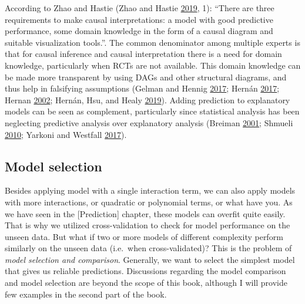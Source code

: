 \documentclass[
]{book}
\begin{document}
According to Zhao and Hastie (Zhao and Hastie \protect\hyperlink{ref-zhaoCausalInterpretationsBlackBox2019}{2019}, 1): ``There are three requirements to make causal interpretations: a model with good predictive performance, some domain knowledge in the form of a causal diagram and suitable visualization tools.''. The common denominator among multiple experts is that for causal inference and causal interpretation there is a need for domain knowledge, particularly when RCTs are not available. This domain knowledge can be made more transparent by using DAGs and other structural diagrams, and thus help in falsifying assumptions (Gelman and Hennig \protect\hyperlink{ref-gelmanSubjectiveObjectiveStatistics2017}{2017}; Hernán \protect\hyperlink{ref-hernanCausalDiagramsDraw2017}{2017}; Hernan \protect\hyperlink{ref-hernanCausalKnowledgePrerequisite2002}{2002}; Hernán, Hsu, and Healy \protect\hyperlink{ref-hernanSecondChanceGet2019}{2019}). Adding prediction to explanatory models can be seen as complement, particularly since statistical analysis has been neglecting predictive analysis over explanatory analysis (Breiman \protect\hyperlink{ref-breimanStatisticalModelingTwo2001}{2001}; Shmueli \protect\hyperlink{ref-shmueliExplainPredict2010}{2010}; Yarkoni and Westfall \protect\hyperlink{ref-yarkoniChoosingPredictionExplanation2017}{2017}).

\hypertarget{model-selection}{%
\subsection{Model selection}\label{model-selection}}

Besides applying model with a single interaction term, we can also apply models with more interactions, or quadratic or polynomial terms, or what have you. As we have seen in the {[}Prediction{]} chapter, these models can overfit quite easily. That is why we utilized cross-validation to check for model performance on the unseen data. But what if two or more models of different complexity perform similarly on the unseen data (i.e.~when cross-validated)? This is the problem of \emph{model selection and comparison}. Generally, we want to select the simplest model that gives us reliable predictions. Discussions regarding the model comparison and model selection are beyond the scope of this book, although I will provide few examples in the second part of the book.
\end{document}
